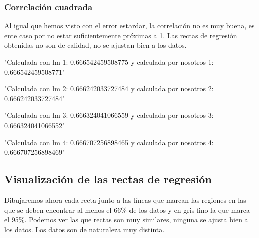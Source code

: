 \documentclass [a4paper] {article}
\begin{document}
\subsubsection{Correlación cuadrada}
Al igual que hemos visto con el error estardar, la correlación no es muy buena, es ente caso por no estar suficientemente próximas a 1.
Las rectas de regresión obtenidas no son de calidad, no se ajustan bien a los datos.
\begin{Schunk}
\begin{Soutput}
[1] "Calculada con lm 1: 0.666542459508775 y calculada por nosotros 1: 0.666542459508771"
\end{Soutput}
\begin{Soutput}
[1] "Calculada con lm 2: 0.666242033727484 y calculada por nosotros 2: 0.666242033727484"
\end{Soutput}
\begin{Soutput}
[1] "Calculada con lm 3: 0.666324041066559 y calculada por nosotros 3: 0.666324041066552"
\end{Soutput}
\begin{Soutput}
[1] "Calculada con lm 4: 0.666707256898465 y calculada por nosotros 4: 0.666707256898469"
\end{Soutput}
\end{Schunk}

\subsection{Visualización de las rectas de regresión}
Dibujaremos ahora cada recta junto a las líneas que marcan las regiones en las que se deben encontrar al menos el 66\% de los datos y en gris fino la que marca el 95\%.
Podemos ver las que rectas son muy similares, ninguna se ajusta bien a los datos.
Los datos son de naturaleza muy distinta.
\end{document}
